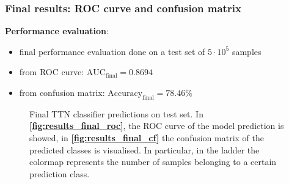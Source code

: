 \documentclass[xcolor=table,8pt]{beamer}
\begin{document}
    \begin{frame}[t]
        \frametitle{Final results: ROC curve and confusion matrix}

        \textbf{Performance evaluation}:
        \begin{itemize}
            \item final performance evaluation done on a test set of \( 5 \cdot 10^{5} \) samples
            \item from ROC curve: \alert{\( \text{AUC}_{\text{final}} = 0.8694 \)}
            \item from confusion matrix: \alert{\( \text{Accuracy}_{\text{final}} = 78.46\% \)}
        \end{itemize}

        \begin{figure}[!h]
            \begin{minipage}[c]{0.50\linewidth}
                \vspace{0pt}
                \centering
            \end{minipage}%
            \begin{minipage}[c]{0.50\linewidth}
                \vspace{0pt}
                \centering
            \end{minipage}%
            \caption{Final TTN classifier predictions on test set. In \textbf{\ref{fig:results_final_roc}}, the ROC curve of the model prediction is showed, in \textbf{\ref{fig:results_final_cf}} the confusion matrix of the predicted classes is visualised. In particular, in the ladder the colormap represents the number of samples belonging to a certain prediction class.}
            \label{fig:results_final}
        \end{figure}
    \end{frame}
\end{document}

